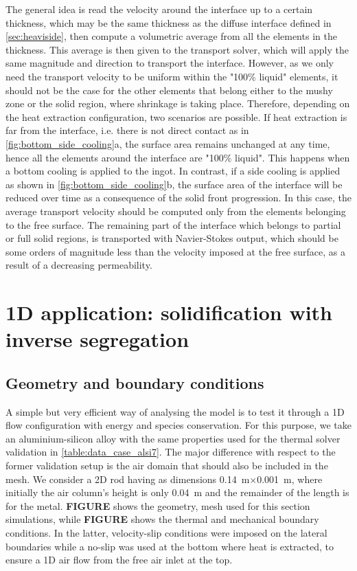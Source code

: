 The general idea is read the velocity around the interface up to a certain thickness, which may be the same 
thickness as the diffuse interface defined in \cref{sec:heaviside}, then compute a volumetric average
from all the elements in the thickness. This average is then given to the transport solver, which will apply
the same magnitude and direction to transport the interface. However, as we only need the transport velocity
to be uniform within the "100\% liquid" elements, it should not be the case for the other elements that belong 
either to the mushy zone or the solid region, where shrinkage is taking place.
Therefore, depending on the heat extraction configuration, two scenarios are possible. If heat extraction is far from
the interface, i.e. there is not direct contact as in \cref{fig:bottom_side_cooling}a, 
the surface area remains unchanged at any time, hence all the elements
around the interface are "100\% liquid". This happens when a bottom cooling is applied to the ingot. In contrast, if a side cooling 
is applied as shown in \cref{fig:bottom_side_cooling}b, the surface area of the interface will be reduced over time
as a consequence of the solid front progression. In this case, the average transport velocity should be computed only
from the elements belonging to the free surface. The remaining part of the interface which belongs to partial or full 
solid regions, is transported with Navier-Stokes output, which should be some orders of magnitude less than the velocity
imposed at the free surface, as a result of a decreasing permeability.

%
\section{1D application: solidification with inverse segregation}
\subsection{Geometry and boundary conditions}
A simple but very efficient way of analysing the model is to test it through a 1D flow configuration with energy and species conservation.
For this purpose, we take an aluminium-silicon alloy with the same properties used for the thermal solver validation in \cref{table:data_case_alsi7}.
The major difference with respect to the former validation setup is the air domain that should also be included in the mesh.
We consider a 2D rod having as dimensions \SI{0.14}{\metre}$\times$\SI{0.001}{m}, where initially the air column's height is only \SI{0.04}{\metre}
and the remainder of the length is for the metal.  
\textbf{FIGURE} shows the geometry, mesh used for this section simulations, while \textbf{FIGURE} shows the thermal and mechanical boundary conditions.
In the latter, velocity-slip conditions were imposed on the lateral boundaries while a no-slip was used at the bottom where heat is extracted,
to ensure a 1D air flow from the free air inlet at the top. 

